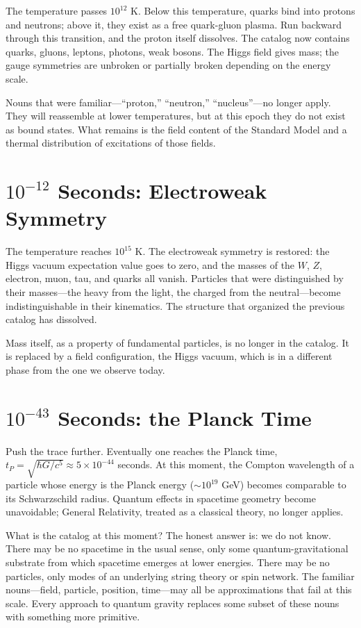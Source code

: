 \documentclass[11pt,a4paper]{book}
\begin{document}
The temperature passes $10^{12}$ K. Below this temperature, quarks bind into protons and neutrons; above it, they exist as a free quark-gluon plasma. Run backward through this transition, and the proton itself dissolves. The catalog now contains quarks, gluons, leptons, photons, weak bosons. The Higgs field gives mass; the gauge symmetries are unbroken or partially broken depending on the energy scale.

Nouns that were familiar---``proton,'' ``neutron,'' ``nucleus''---no longer apply. They will reassemble at lower temperatures, but at this epoch they do not exist as bound states. What remains is the field content of the Standard Model and a thermal distribution of excitations of those fields.

\section*{$10^{-12}$ Seconds: Electroweak Symmetry}

The temperature reaches $10^{15}$ K. The electroweak symmetry is restored: the Higgs vacuum expectation value goes to zero, and the masses of the $W$, $Z$, electron, muon, tau, and quarks all vanish. Particles that were distinguished by their masses---the heavy from the light, the charged from the neutral---become indistinguishable in their kinematics. The structure that organized the previous catalog has dissolved.

Mass itself, as a property of fundamental particles, is no longer in the catalog. It is replaced by a field configuration, the Higgs vacuum, which is in a different phase from the one we observe today.

\section*{$10^{-43}$ Seconds: the Planck Time}

Push the trace further. Eventually one reaches the Planck time, $t_P = \sqrt{\hbar G / c^5} \approx 5 \times 10^{-44}$ seconds. At this moment, the Compton wavelength of a particle whose energy is the Planck energy ($\sim 10^{19}$ GeV) becomes comparable to its Schwarzschild radius. Quantum effects in spacetime geometry become unavoidable; General Relativity, treated as a classical theory, no longer applies.

What is the catalog at this moment? The honest answer is: we do not know. There may be no spacetime in the usual sense, only some quantum-gravitational substrate from which spacetime emerges at lower energies. There may be no particles, only modes of an underlying string theory or spin network. The familiar nouns---field, particle, position, time---may all be approximations that fail at this scale. Every approach to quantum gravity replaces some subset of these nouns with something more primitive.
\end{document}
